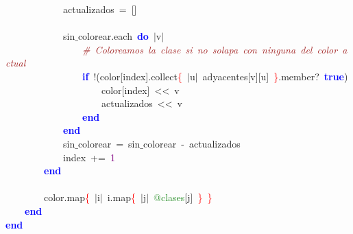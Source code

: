 \mbox{}\ \ \ \ \ \ \ \ \ \ \ \ actualizados\ \textcolor{BrickRed}{=}\ \textcolor{BrickRed}{[]} \\
\mbox{}\ \ \ \ \ \ \ \ \ \ \ \  \\
\mbox{}\ \ \ \ \ \ \ \ \ \ \ \ sin$\_$colorear\textcolor{BrickRed}{.}each\ \textbf{\textcolor{Blue}{do}}\ \textcolor{BrickRed}{$|$}v\textcolor{BrickRed}{$|$} \\
\mbox{}\ \ \ \ \ \ \ \ \ \ \ \ \ \ \ \ \textit{\textcolor{Brown}{\#\ Coloreamos\ la\ clase\ si\ no\ solapa\ con\ ninguna\ del\ color\ actual}} \\
\mbox{}\ \ \ \ \ \ \ \ \ \ \ \ \ \ \ \ \textbf{\textcolor{Blue}{if}}\ \textcolor{BrickRed}{!(}color\textcolor{BrickRed}{[}index\textcolor{BrickRed}{].}collect\textcolor{Red}{\{}\ \textcolor{BrickRed}{$|$}u\textcolor{BrickRed}{$|$}\ adyacentes\textcolor{BrickRed}{[}v\textcolor{BrickRed}{][}u\textcolor{BrickRed}{]}\ \textcolor{Red}{\}}\textcolor{BrickRed}{.}member?\ \textbf{\textcolor{Blue}{true}}\textcolor{BrickRed}{)} \\
\mbox{}\ \ \ \ \ \ \ \ \ \ \ \ \ \ \ \ \ \ \ \ color\textcolor{BrickRed}{[}index\textcolor{BrickRed}{]}\ \textcolor{BrickRed}{\textless{}\textless{}}\ v \\
\mbox{}\ \ \ \ \ \ \ \ \ \ \ \ \ \ \ \ \ \ \ \ actualizados\ \textcolor{BrickRed}{\textless{}\textless{}}\ v \\
\mbox{}\ \ \ \ \ \ \ \ \ \ \ \ \ \ \ \ \textbf{\textcolor{Blue}{end}} \\
\mbox{}\ \ \ \ \ \ \ \ \ \ \ \ \textbf{\textcolor{Blue}{end}} \\
\mbox{}\ \ \ \ \ \ \ \ \ \ \ \ sin$\_$colorear\ \textcolor{BrickRed}{=}\ sin$\_$colorear\ \textcolor{BrickRed}{-}\ actualizados \\
\mbox{}\ \ \ \ \ \ \ \ \ \ \ \ index\ \textcolor{BrickRed}{+=}\ \textcolor{Purple}{1} \\
\mbox{}\ \ \ \ \ \ \ \ \textbf{\textcolor{Blue}{end}} \\
\mbox{}\ \ \ \ \ \ \ \  \\
\mbox{}\ \ \ \ \ \ \ \ color\textcolor{BrickRed}{.}map\textcolor{Red}{\{}\ \textcolor{BrickRed}{$|$}i\textcolor{BrickRed}{$|$}\ i\textcolor{BrickRed}{.}map\textcolor{Red}{\{}\ \textcolor{BrickRed}{$|$}j\textcolor{BrickRed}{$|$}\ \textcolor{ForestGreen}{@clases}\textcolor{BrickRed}{[}j\textcolor{BrickRed}{]}\ \textcolor{Red}{\}}\ \textcolor{Red}{\}}\ \ \ \ \ \ \  \\
\mbox{}\ \ \ \ \textbf{\textcolor{Blue}{end}} \\
\mbox{}\textbf{\textcolor{Blue}{end}} \\
